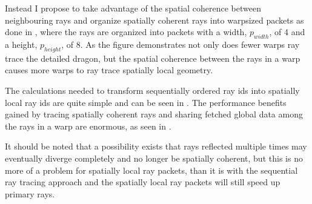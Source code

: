 Instead I propose to take advantage of the spatial coherence between
neighbouring rays and organize spatially coherent rays into warpsized packets as
done in , where the rays are organized into packets
with a width, $p_{width}$, of 4 and a height, $p_{height}$, of 8. As the figure
demonstrates not only does fewer warps ray trace the detailed dragon, but the
spatial coherence between the rays in a warp causes more warps to ray trace
spatially local geometry.

\begin{figure}
  \hspace{20pt}
  \caption[Sequantial and spatially coherent rays per warp.]{}
\end{figure}

The calculations needed to transform sequentially ordered ray ids into spatially
local ray ids are quite simple and can be seen in . The
performance benefits gained by tracing spatially coherent rays and sharing
fetched global data among the rays in a warp are enormous, as seen in
.

It should be noted that a possibility exists that rays reflected multiple times
may eventually diverge completely and no longer be spatially coherent, but this
is no more of a problem for spatially local ray packets, than it is with the
sequential ray tracing approach and the spatially local ray packets will still
speed up primary rays.

